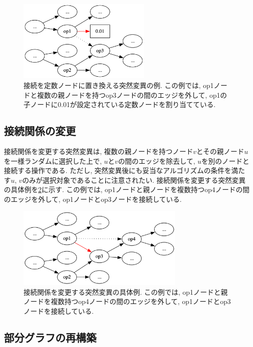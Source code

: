\documentclass[11pt,oneside,openany,report]{jsbook}
\begin{document}
\begin{figure}
  \centering
  \includegraphics[width=6.5cm]{mgg_automl_zero_vag/mutations/connection_to_const.png}
  \caption{接続を定数ノードに置き換える突然変異の例. この例では, op1ノードと複数の親ノードを持つop3ノードの間のエッジを外して, op1の子ノードに0.01が設定されている定数ノードを割り当てている.}
  \label{fig:mgg_automl_zero_vag:mutation:connection_to_const}
\end{figure}

\subsection{接続関係の変更}
接続関係を変更する突然変異は, 複数の親ノードを持つノード$v$とその親ノード$u$を一様ランダムに選択した上で, $u$と$v$の間のエッジを除去して, $u$を別のノードと接続する操作である. ただし, 突然変異後にも妥当なアルゴリズムの条件を満たす$u$, $v$のみが選択対象であることに注意されたい. 接続関係を変更する突然変異の具体例を\ref{fig:mgg_automl_zero_vag:mutation:change_connection}に示す. この例では, op1ノードと親ノードを複数持つop4ノードの間のエッジを外して, op1ノードとop3ノードを接続している.

\begin{figure}
  \centering
  \includegraphics[width=8.2cm]{mgg_automl_zero_vag/mutations/change_connection.png}
  \caption{接続関係を変更する突然変異の具体例. この例では, op1ノードと親ノードを複数持つop4ノードの間のエッジを外して, op1ノードとop3ノードを接続している.}
  \label{fig:mgg_automl_zero_vag:mutation:change_connection}
\end{figure}

\subsection{部分グラフの再構築}
\end{document}

